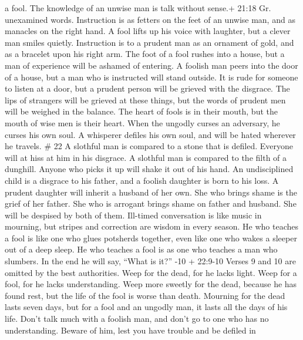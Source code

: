 a fool. The knowledge of an unwise man is talk without sense.+ 21:18 Gr.
unexamined words.  Instruction is as fetters on the feet of
an unwise man, and as manacles on the right hand.  A fool
lifts up his voice with laughter, but a clever man smiles quietly.
 Instruction is to a prudent man as an ornament of gold,
and as a bracelet upon his right arm.  The foot of a fool
rushes into a house, but a man of experience will be ashamed of
entering.  A foolish man peers into the door of a house,
but a man who is instructed will stand outside.  It is rude
for someone to listen at a door, but a prudent person will be grieved
with the disgrace.  The lips of strangers will be grieved
at these things, but the words of prudent men will be weighed in the
balance.  The heart of fools is in their mouth, but the
mouth of wise men is their heart.  When the ungodly curses
an adversary, he curses his own soul.  A whisperer defiles
his own soul, and will be hated wherever he travels. \# 22 
A slothful man is compared to a stone that is defiled. Everyone will at
hiss at him in his disgrace.  A slothful man is compared to
the filth of a dunghill. Anyone who picks it up will shake it out of his
hand.  An undisciplined child is a disgrace to his father,
and a foolish daughter is born to his loss.  A prudent
daughter will inherit a husband of her own. She who brings shame is the
grief of her father.  She who is arrogant brings shame on
father and husband. She will be despised by both of them. 
Ill-timed conversation is like music in mourning, but stripes and
correction are wisdom in every season.  He who teaches a
fool is like one who glues potsherds together, even like one who wakes a
sleeper out of a deep sleep.  He who teaches a fool is as
one who teaches a man who slumbers. In the end he will say, ``What is
it?'' -10 + 22:9-10 Verses 9 and 10 are omitted by the best
authorities.  Weep for the dead, for he lacks light. Weep
for a fool, for he lacks understanding. Weep more sweetly for the dead,
because he has found rest, but the life of the fool is worse than death.
 Mourning for the dead lasts seven days, but for a fool and
an ungodly man, it lasts all the days of his life.  Don't
talk much with a foolish man, and don't go to one who has no
understanding. Beware of him, lest you have trouble and be defiled in
